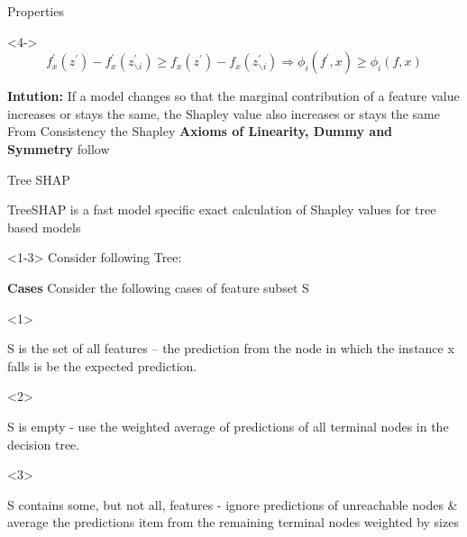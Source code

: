 \documentclass[11pt,compress,t,notes=noshow, aspectratio=169, xcolor=table]{beamer}
\begin{document}
\begin{vbframe}{Properties}
\begin{onlyenv}<4->
$$
f_{x}^{\prime}\left(z^{\prime}\right)-f_{x}^{\prime}\left(z^{\prime}_{\backslash i}\right) \geq f_{x}\left(z^{\prime}\right)-f_{x}\left(z^{\prime} _{\backslash i}\right) \Longrightarrow \phi_{i}\left(f^{\prime}, x\right) \geq \phi_{i}(f, x)
$$

\textbf{Intution:} If a model changes so that the marginal contribution of a feature value increases or stays the same, the Shapley value also increases or stays the same\\ 
From Consistency the Shapley \textbf{Axioms of Linearity, Dummy and Symmetry} follow
\end{onlyenv}


\end{vbframe}

\begin{vbframe}{Tree SHAP}

TreeSHAP is a fast model specific exact calculation of Shapley values for tree based models

\begin{onlyenv}<1-3>
\vspace{0.5cm}
Consider following Tree:

\textbf{Cases}
Consider the following cases of feature subset S

\begin{itemize}
    \begin{onlyenv}<1>
    \item  S is the set of all features – 
    the prediction from the node in which the instance x falls is be the expected prediction.
    \end{onlyenv}
    \begin{onlyenv}<2>
    \item S is empty -
    use the weighted average of predictions of all terminal nodes in the decision tree. \\
     
    \end{onlyenv}
    \begin{onlyenv}<3>
    \item S contains some, but not all, features -
    ignore predictions of unreachable nodes \& average the predictions item from the remaining terminal nodes weighted by  sizes
    \end{onlyenv}
\end{itemize}


\end{onlyenv}
\end{vbframe}
\end{document}

